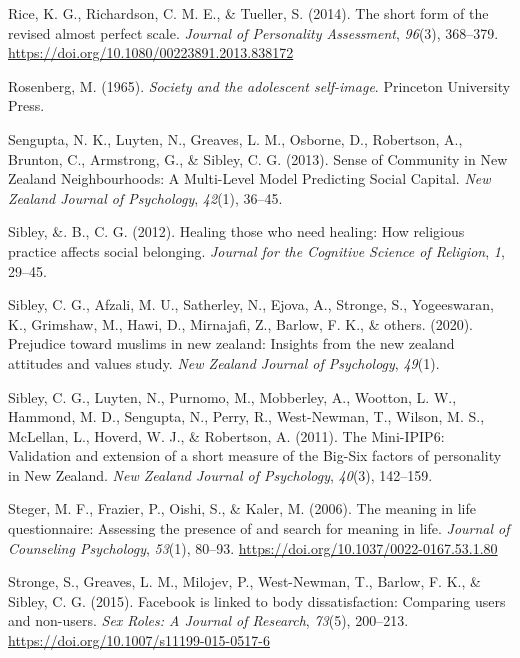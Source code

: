 \documentclass[
  letterpaper,
  DIV=11,
  numbers=noendperiod]{scrartcl}
\newlength{\cslhangindent}
\newlength{\cslentryspacingunit} %
\newenvironment{CSLReferences}[2] %
 {%
  \setlength{\parindent}{0pt}
  \ifodd #1
  \let\oldpar\par
  \def\par{\hangindent=\cslhangindent\oldpar}
  \fi
  \setlength{\parskip}{#2\cslentryspacingunit}
 }%
 {}
\begin{document}
\begin{CSLReferences}{1}{0}
\leavevmode{}%
Rice, K. G., Richardson, C. M. E., \& Tueller, S. (2014). The short form
of the revised almost perfect scale. \emph{Journal of Personality
Assessment}, \emph{96}(3), 368--379.
\url{https://doi.org/10.1080/00223891.2013.838172}

\leavevmode{}%
Rosenberg, M. (1965). \emph{Society and the adolescent self-image}.
Princeton University Press.

\leavevmode{}%
Sengupta, N. K., Luyten, N., Greaves, L. M., Osborne, D., Robertson, A.,
Brunton, C., Armstrong, G., \& Sibley, C. G. (2013). Sense of Community
in New Zealand Neighbourhoods: A Multi-Level Model Predicting Social
Capital. \emph{New Zealand Journal of Psychology}, \emph{42}(1), 36--45.

\leavevmode{}%
Sibley, \&. B., C. G. (2012). Healing those who need healing: How
religious practice affects social belonging. \emph{Journal for the
Cognitive Science of Religion}, \emph{1}, 29--45.

\leavevmode{}%
Sibley, C. G., Afzali, M. U., Satherley, N., Ejova, A., Stronge, S.,
Yogeeswaran, K., Grimshaw, M., Hawi, D., Mirnajafi, Z., Barlow, F. K.,
\& others. (2020). Prejudice toward muslims in new zealand: Insights
from the new zealand attitudes and values study. \emph{New Zealand
Journal of Psychology}, \emph{49}(1).

\leavevmode{}%
Sibley, C. G., Luyten, N., Purnomo, M., Mobberley, A., Wootton, L. W.,
Hammond, M. D., Sengupta, N., Perry, R., West-Newman, T., Wilson, M. S.,
McLellan, L., Hoverd, W. J., \& Robertson, A. (2011). The Mini-IPIP6:
Validation and extension of a short measure of the Big-Six factors of
personality in New Zealand. \emph{New Zealand Journal of Psychology},
\emph{40}(3), 142--159.

\leavevmode{}%
Steger, M. F., Frazier, P., Oishi, S., \& Kaler, M. (2006). The meaning
in life questionnaire: Assessing the presence of and search for meaning
in life. \emph{Journal of Counseling Psychology}, \emph{53}(1), 80--93.
\url{https://doi.org/10.1037/0022-0167.53.1.80}

\leavevmode{}%
Stronge, S., Greaves, L. M., Milojev, P., West-Newman, T., Barlow, F.
K., \& Sibley, C. G. (2015). Facebook is linked to body dissatisfaction:
Comparing users and non-users. \emph{Sex Roles: A Journal of Research},
\emph{73}(5), 200--213. \url{https://doi.org/10.1007/s11199-015-0517-6}


\end{CSLReferences}
\end{document}

